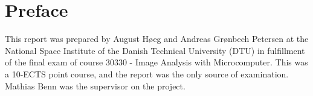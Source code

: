 \newpage
\section*{Preface}
This report was prepared by August Høeg and Andreas Grønbech Petersen at the National Space Institute of the Danish Technical University (DTU) in fulfillment of the final exam of course 30330 - Image Analysis with Microcomputer. This was a 10-ECTS point course, and the report was the only source of examination. Mathias Benn was the supervisor on the project. 
\newpage



